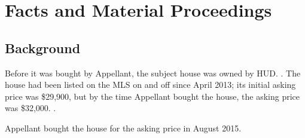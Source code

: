 \documentclass[12pt,\documentclassflag]{michiganCourtOfAppealsBrief}
\begin{document}
\pagestyle{plain}





\section{Facts and Material Proceedings}
\label{facts}

\subsection{Background}

Before it was bought by Appellant, the subject house was owned by HUD.
\mlsListing[]. 
The house had been listed on the MLS on and off since April 2013;
its initial asking price was \$29,900,
but by the time Appellant bought the house, the asking price was \$32,000. \mlsHistory[].


Appellant bought the house for the asking price in August 2015. 
\end{document}
